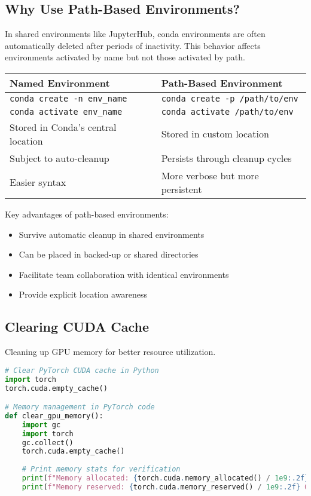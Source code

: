 \documentclass{article}
\begin{document}
\subsection{Why Use Path-Based Environments?}

In shared environments like JupyterHub, conda environments are often automatically deleted after periods of inactivity. This behavior affects environments activated by name but not those activated by path.

\begin{tcolorbox}[colback=blue!5!white, colframe=blue!75!black, title=Named vs. Path-Based Conda Environments]
\begin{tabular}{p{6cm}|p{6cm}}
\hline
\textbf{Named Environment} & \textbf{Path-Based Environment} \\
\hline
\texttt{conda create -n env\_name} & \texttt{conda create -p /path/to/env} \\
\texttt{conda activate env\_name} & \texttt{conda activate /path/to/env} \\
Stored in Conda's central location & Stored in custom location \\
Subject to auto-cleanup & Persists through cleanup cycles \\
Easier syntax & More verbose but more persistent \\
\hline
\end{tabular}
\end{tcolorbox}

Key advantages of path-based environments:
\begin{itemize}
    \item Survive automatic cleanup in shared environments
    \item Can be placed in backed-up or shared directories
    \item Facilitate team collaboration with identical environments
    \item Provide explicit location awareness
\end{itemize}

\subsection{Clearing CUDA Cache}
Cleaning up GPU memory for better resource utilization.

\begin{tcolorbox}[colback=orange!5!white, colframe=orange!75!black, title=CUDA Cache Management]
\begin{lstlisting}[language=python]
# Clear PyTorch CUDA cache in Python
import torch
torch.cuda.empty_cache()

# Memory management in PyTorch code
def clear_gpu_memory():
    import gc
    import torch
    gc.collect()
    torch.cuda.empty_cache()
    
    # Print memory stats for verification
    print(f"Memory allocated: {torch.cuda.memory_allocated() / 1e9:.2f} GB")
    print(f"Memory reserved: {torch.cuda.memory_reserved() / 1e9:.2f} GB")
\end{lstlisting}
\end{tcolorbox}
\end{document}

